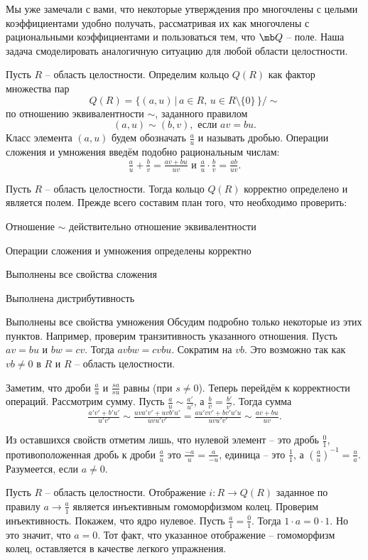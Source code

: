 Мы уже замечали с вами, что некоторые утверждения про многочлены с целыми коэффициентами удобно получать, рассматривая их как многочлены с рациональными коэффициентами и пользоваться тем, что $\mb Q$ -- поле. Наша задача смоделировать аналогичную ситуацию для любой области целостности.

 Пусть  $R$ -- область целостности. Определим кольцо $Q(R)$ как
фактор множества пар
$$ Q(R)=\{ (a,u)\,|\, a\in R, \, u\in R\setminus\{0\} \,\}/\sim$$
по отношению эквивалентности $\sim$, заданного правилом
$$ (a,u)\sim (b,v), \text{ если } av=bu.$$
Класс элемента $(a,u)$ будем обозначать  $\frac{a}{u}$ и называть дробью.
Операции сложения и умножения введём подобно рациональным числам:
$$ \tfrac{a}{u}+\tfrac{b}{v}=\tfrac{av+bu}{uv} \text{ и } \tfrac{a}{u}\cdot\tfrac{b}{v}=\tfrac{ab}{uv}.$$
\edfn




 Пусть  $R$ -- область целостности. Тогда  кольцо $Q(R)$ корректно определено и является полем.
\ethrm
\proof
Прежде всего составим план того, что необходимо проверить:
\enm
\item Отношение $\sim$ действительно отношение эквивалентности
\item Операции сложения и умножения определены корректно
\item Выполнены все свойства сложения
\item Выполнена дистрибутивность
\item Выполнены все свойства умножения
\eenm
Обсудим подробно только некоторые из этих пунктов. Например, проверим транзитивность указанного отношения. Пусть $av=bu$ и $bw=cv$. Тогда $avbw=cvbu$. Сократим на $vb$. Это возможно так как $vb \neq 0$ в $R$ и $R$ -- область целостности.

Заметим, что дроби $\frac{a}{u}$ и $\frac{sa}{su}$ равны (при $s\neq 0$).
Теперь перейдём к корректности операций. Рассмотрим сумму. Пусть $\tfrac{a}{u}\sim \tfrac{a'}{u'}$, а  $\tfrac{b}{v}=\tfrac{b'}{v'}$. Тогда сумма
$$\tfrac{a'v'+b'u'}{u'v'}\sim \tfrac{uva'v'+uvb'u'}{uvu'v'}= \tfrac{au'vv'+bv'u'u}{uvu'v'}\sim \tfrac{av+bu}{uv}.$$

Из оставшихся свойств отметим лишь, что нулевой элемент -- это дробь $\frac{0}{1}$, противоположенная дробь к дроби $\frac{a}{u}$ это $\frac{-a}{u}=\frac{a}{-u}$, единица -- это $\frac{1}{1}$, а $\left(\frac{a}{u}\right)^{-1}=\frac{u}{a}$. Разумеется, если $a\neq 0$.
\endproof

 Пусть  $R$ -- область целостности. Отображение $i\colon R\to Q(R)$ заданное по правилу $a\to \tfrac{a}{1}$ является инъективным гомоморфизмом колец.
\ethrm
\proof Проверим инъективность. Покажем, что ядро нулевое. Пусть $\tfrac{a}{1}= \tfrac{0}{1}$. Тогда $1\cdot a=0\cdot 1$. Но это значит, что $a=0$. 
Тот факт, что указанное отображение -- гомоморфизм колец, оставляется в качестве легкого упражнения. 

